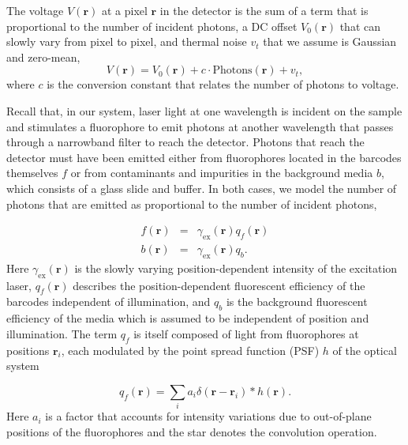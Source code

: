 The voltage $V(\mathbf{r})$ at a pixel $\mathbf{r}$ in the detector is the sum of a term that is proportional to the number of incident photons, a DC offset $V_0(\mathbf{r})$ that can slowly vary from pixel to pixel, and thermal noise $v_t$ that we assume is Gaussian and zero-mean,
\begin{equation}\label{eq:V_of_r}
V(\mathbf{r})=V_0(\mathbf{r})+c \cdot \text{Photons}(\mathbf{r}) +v_t,
\end{equation}
where $c$ is the conversion constant that relates the number of photons to voltage. 


Recall that, in our system, laser light at one wavelength is incident on the sample and stimulates a fluorophore to emit photons at another wavelength that passes through a narrowband filter to reach the detector. Photons that reach the detector must have been emitted either from fluorophores located  in the barcodes themselves $f$ or from contaminants and impurities in the background media $b$, which consists of a glass slide and buffer.  In both cases, we model the number of photons that are emitted as proportional to the number of incident photons, 

\begin{eqnarray}\label{eq:f_and_b}
f(\mathbf{r})&=&\gamma_{\text{ex}}(\mathbf{r}) q_f(\mathbf{r})\\
b(\mathbf{r})&=&\gamma_{\text{ex}}(\mathbf{r}) q_b.
\end{eqnarray}
Here $\gamma_{\text{ex}}(\mathbf{r})$ is the slowly varying position-dependent intensity of the excitation laser,  $q_f(\mathbf{r})$ describes the position-dependent fluorescent efficiency of the barcodes independent of illumination, and $q_b$ is the background fluorescent efficiency of the media which is assumed to be independent of position and illumination. The term $q_f$ is itself composed of light from fluorophores at positions $\mathbf{r}_i$, each modulated by the point spread function (PSF) $h$ of the optical system

\begin{equation}
q_f(\mathbf{r})=\sum_i a_i \delta(\mathbf{r}-\mathbf{r}_i) * h(\mathbf{r}).
\end{equation}
Here $a_i$ is a factor that accounts for intensity variations due to out-of-plane positions of the fluorophores and the star denotes the convolution operation.

